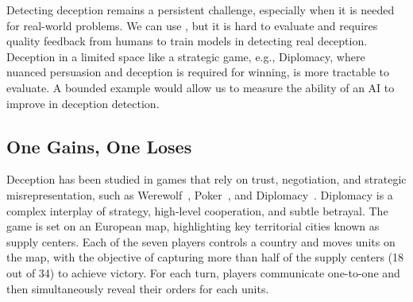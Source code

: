 Detecting deception remains a persistent challenge, especially when it is needed for real-world problems.
We can use , but it is hard to evaluate and requires quality feedback from humans to train models in detecting real deception. 
%
Deception in a limited space like a strategic game, e.g., Diplomacy, where nuanced persuasion and deception is required for winning, is more tractable to evaluate.
%
A bounded example would allow us to measure the ability of an AI to improve in deception detection.

%

\subsection{One Gains, One Loses}

Deception has been studied in games that rely on trust, negotiation, and strategic misrepresentation, such as Werewolf~\citep{chittaranjan2010you,hancock2017towards,girlea2017deception}, Poker~\citep{lee2013deception, palomaki2016machiavelli}, and Diplomacy~\citep{niculae-etal-2015-linguistic,kramar2022negotiation}. Diplomacy is a complex interplay of strategy, high-level cooperation, and subtle betrayal. The game is set on an European map, highlighting key territorial cities known as supply centers. Each of the seven players controls a country and moves units on the map, with the objective of capturing more than half of the supply centers (18 out of 34) to achieve victory. For each turn, players communicate one-to-one and then simultaneously reveal their orders for each units.

